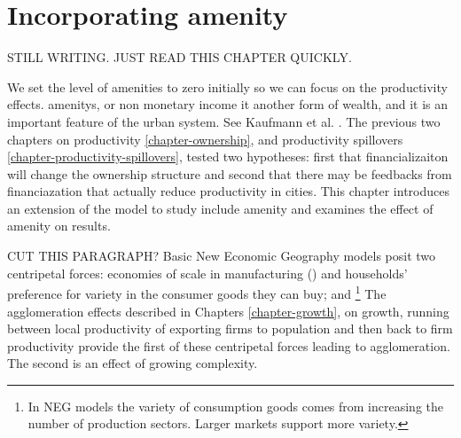 \chapter[Amenity]{Incorporating amenity}\label{chapter-amenity}


STILL WRITING. JUST READ THIS CHAPTER QUICKLY.

We set the level of amenities to zero initially so we can focus on the productivity effects.  \glspl{amenity}, or non monetary income it another form of wealth, and it is %
an important feature of the urban system. See Kaufmann et al. \cite{kaufmannScalingUrbanAmenities2022}. 
The previous two chapters on productivity \ref{chapter-ownership}, and productivity spillovers \ref{chapter-productivity-spillovers}, tested two hypotheses: first that financializaiton will change the ownership structure and second that there may be feedbacks from financiazation that actually reduce productivity in cities. This chapter introduces an extension of the model to study include \gls{amenity} and examines the effect of amenity on results.

CUT THIS PARAGRAPH? Basic New Economic Geography models posit two centripetal forces: economies of scale in manufacturing (\cite{gurwitzCatastrophicAgglomeration2019}) and households' preference for variety in the consumer goods they can buy; and \footnote{In NEG models the variety of consumption goods comes from increasing the number of  production sectors. Larger markets support more variety.} The agglomeration effects described in Chapters \ref{chapter-growth}, on growth,  running between local productivity  of exporting firms to population and then back to firm productivity provide the first of these centripetal forces leading to agglomeration. The second is an effect of growing complexity. 

